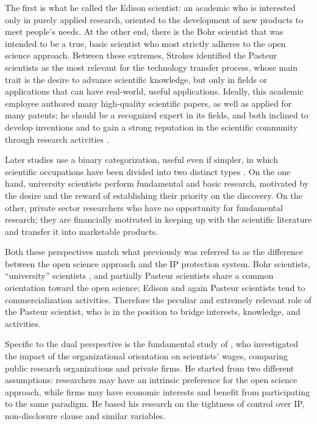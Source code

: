 The first is what he called the Edison scientist: an academic who is interested only in purely applied research, oriented to the development of new products to meet people's needs. At the other end, there is the Bohr scientist that was intended to be a true, basic scientist who most strictly adheres to the open science approach. Between these extremes, Strokes identified the Pasteur scientists as the most relevant for the technology transfer process, whose main trait is the desire to advance scientific knowledge, but only in fields or applications that can have real-world, useful applications. Ideally, this academic employee authored many high-quality scientific papers, as well as applied for many patents; he should be a recognized expert in its fields, and both inclined to develop inventions and to gain a strong reputation in the scientific community through research activities \citep{Baba2009}.

Later studies use a binary categorization, useful even if simpler, in which scientific occupations have been divided into two distinct types \citep{Beath2000}. On the one hand, university scientists perform fundamental and basic research, motivated by the desire and the reward of establishing their priority on the discovery. On the other, private sector researchers who have no opportunity for fundamental research; they are financially motivated in keeping up with the scientific literature and transfer it into marketable products. 

Both these perspectives match what previously was referred to as the difference between the open science approach and the IP protection system. Bohr scientists, \enquote{university} scientists \citep{Beath2000}, and partially Pasteur scientists share a common orientation toward the open science; Edison and again Pasteur scientists tend to commercialization activities. Therefore the peculiar and extremely relevant role of the Pasteur scientist, who is in the position to bridge interests, knowledge, and activities.

Specific to the dual perspective is the fundamental study of \citet{Stern2004}, who investigated the impact of the organizational orientation on scientists' wages, comparing public research organizations and private firms. He started from two different assumptions: researchers may have an intrinsic preference for the open science approach, while firms may have economic interests and benefit from participating to the same paradigm. He based his research on the tightness of control over IP, non-disclosure clause and similar variables.

